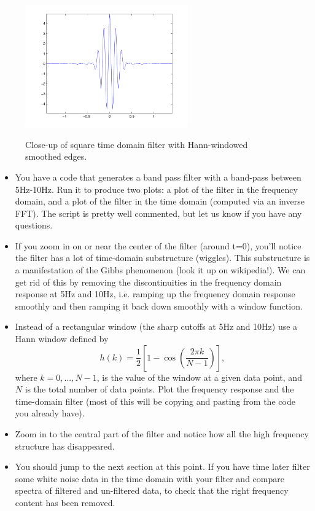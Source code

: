 \documentclass[prd,floatfix,preprintnumbers,amsmath,amssymb,nofootinbib,superscriptaddress]{revtex4}
\begin{document}
\begin{itemize}
\begin{figure}[h]
\includegraphics[width=7cm]{filter-hann}\\
\caption{Close-up of square time domain filter with Hann-windowed smoothed edges.}
\end{figure}


\begin{itemize}

\item You have a code that generates a band pass filter with a band-pass between 5Hz-10Hz. Run it 
to produce two plots: a plot of the filter in the frequency domain, and a plot of the filter in the time domain 
(computed via an inverse FFT). The script is pretty well commented, but let us know if you have any questions.

\item If you zoom in on or near the center of the filter (around t=0), you'll notice the filter has a lot of 
time-domain substructure (wiggles). This substructure is a manifestation of the Gibbs phenomenon 
(look it up on wikipedia!). We can get rid of this by removing the discontinuities in the frequency domain response 
at 5Hz and 10Hz, i.e. ramping up the frequency domain response smoothly and then ramping it back down smoothly 
with a window function.

\item Instead of a rectangular window (the sharp cutoffs at 5Hz and 10Hz) use a Hann window defined by 
$$
h(k)=\frac{1}{2} \left[ 1-\cos \left( \frac{2 \pi k}{N-1}\right) \right], 
$$
where $k=0,...,N-1$, is the value of the window at a given data point, and $N$ is the total number of data points. 
Plot the frequency response and the time-domain filter (most of this will be copying and pasting from the code 
you already have).

\item Zoom in to the central part of the filter and notice how all the high frequency structure has disappeared.



\item  You should jump to the next section at this point. If you 
have time later filter some white noise data in the time domain
with your filter and compare spectra of filtered and un-filtered data, to check that 
the right frequency content has been removed.

\end{itemize}

\end{itemize}
\end{document}
